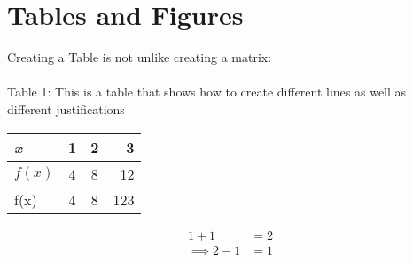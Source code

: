 \documentclass{article}
\begin{document}
\section{Tables and Figures}
Creating a Table is not unlike creating a matrix:
\\ \\
Table 1: This is a table that shows how to create different lines as well as different justifications

\begin{center}
	\begin{tabular}{|l|c|c|r|}
		\hline
		\emph{x}        & 1 & 2 & 3   \\
		\hline
		\emph{\(f(x)\)} & 4 & 8 & 12  \\
		f(x)            & 4 & 8 & 123 \\
		\hline
	\end{tabular}
\end{center}

\begin{align}
	1 + 1          & = 2
	\\
	\implies 2 - 1 & = 1
\end{align}
\end{document}
